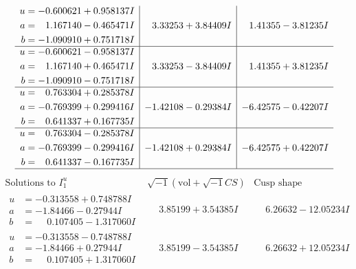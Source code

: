 \documentclass[1p]{elsarticle_modified}
\theoremstyle{definition}
\newcommand{\I}{\sqrt{-1}}
\begin{document}
$$\begin{array}{c|c|c}
\begin{aligned}
u &= -0.600621 + 0.958137 I \\
a &= \phantom{-}1.167140 - 0.465471 I \\
b &= -1.090910 + 0.751718 I\end{aligned}
 & \phantom{-}3.33253 + 3.84409 I & \phantom{-}1.41355 - 3.81235 I \\ \hline\begin{aligned}
u &= -0.600621 - 0.958137 I \\
a &= \phantom{-}1.167140 + 0.465471 I \\
b &= -1.090910 - 0.751718 I\end{aligned}
 & \phantom{-}3.33253 - 3.84409 I & \phantom{-}1.41355 + 3.81235 I \\ \hline\begin{aligned}
u &= \phantom{-}0.763304 + 0.285378 I \\
a &= -0.769399 + 0.299416 I \\
b &= \phantom{-}0.641337 + 0.167735 I\end{aligned}
 & -1.42108 - 0.29384 I & -6.42575 - 0.42207 I \\ \hline\begin{aligned}
u &= \phantom{-}0.763304 - 0.285378 I \\
a &= -0.769399 - 0.299416 I \\
b &= \phantom{-}0.641337 - 0.167735 I\end{aligned}
 & -1.42108 + 0.29384 I & -6.42575 + 0.42207 I\\
 \hline 
 \end{array}$$\newpage$$\begin{array}{c|c|c}  
\text{Solutions to }I^u_{1}& \I (\text{vol} + \sqrt{-1}CS) & \text{Cusp shape}\\
 \hline 
\begin{aligned}
u &= -0.313558 + 0.748788 I \\
a &= -1.84466 - 0.27944 I \\
b &= \phantom{-}0.107405 - 1.317060 I\end{aligned}
 & \phantom{-}3.85199 + 3.54385 I & \phantom{-}6.26632 - 12.05234 I \\ \hline\begin{aligned}
u &= -0.313558 - 0.748788 I \\
a &= -1.84466 + 0.27944 I \\
b &= \phantom{-}0.107405 + 1.317060 I\end{aligned}
 & \phantom{-}3.85199 - 3.54385 I & \phantom{-}6.26632 + 12.05234 I \\ \hline\begin{aligned}

\end{aligned}
\end{array}$$
\end{document}

